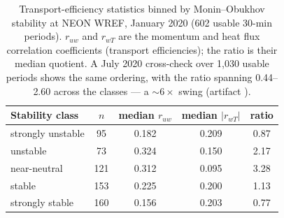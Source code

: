 \documentclass[11pt]{article}
\begin{document}
\begin{table}[h]
\centering
\caption{Transport-efficiency statistics binned by Monin--Obukhov stability at
NEON WREF, January 2020 (602 usable 30-min periods). $r_{uw}$ and $r_{wT}$ are
the momentum and heat flux correlation coefficients (transport efficiencies);
the ratio is their median quotient. A July 2020 cross-check over 1{,}030 usable
periods shows the same ordering, with the ratio spanning 0.44--2.60 across the
classes --- a $\sim 6\times$ swing (artifact
).}
\label{tab:stability}
\begin{tabular}{lcccc}
\toprule
Stability class & $n$ & median $r_{uw}$ & median $|r_{wT}|$ & ratio \\
\midrule
strongly unstable & 95 & 0.182 & 0.209 & 0.87 \\
unstable & 73 & 0.324 & 0.150 & 2.17 \\
near-neutral & 121 & 0.312 & 0.095 & 3.28 \\
stable & 153 & 0.225 & 0.200 & 1.13 \\
strongly stable & 160 & 0.156 & 0.203 & 0.77 \\
\bottomrule
\end{tabular}
\end{table}
\end{document}
